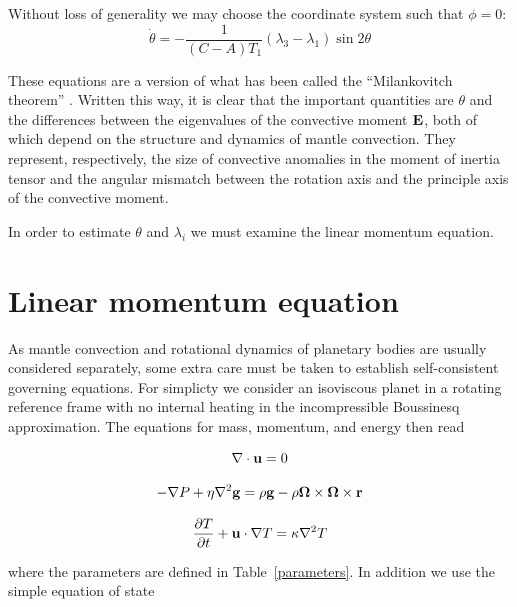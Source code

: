 \documentclass[extra,mreferee]{gji}
\begin{document}
Without loss of generality we may choose the coordinate system such that $\phi=0$:
\begin{equation}
\dot{\theta} = - \frac{1}{(C-A)T_1} (\lambda_3-\lambda_1) \sin{2 \theta}
\label{simple_milankovitch}
\end{equation}

These equations are a version of what has been called the ``Milankovitch theorem'' \citep{munk1960rotation}.  
Written this way, it is clear that the important quantities are $\theta$ and the differences between the eigenvalues of the convective moment $\bf E$, both of which depend on the structure and dynamics of mantle convection.  
They represent, respectively, the size of convective anomalies in the moment of inertia tensor and the angular mismatch between the rotation axis and the principle axis of the convective moment.

In order to estimate $\theta$ and $\lambda_i$ we must examine the linear momentum equation.


\section{Linear momentum equation}
\label{sec:linear}

As mantle convection and rotational dynamics of planetary bodies are usually considered separately, some extra care must be taken to establish self-consistent governing equations.  
For simplicty we consider an isoviscous planet in a rotating reference frame with no internal heating in the incompressible Boussinesq approximation.  The equations for mass, momentum, and energy then read

\begin{equation}
\nabla \cdot {\bf u} = 0
\label{conserve_mass}
\end{equation}

\begin{equation}
\begin{aligned}
- \nabla P + \eta \nabla^2 {\bf g} =  \rho {\bf g} -  \rho{\bf \Omega \times \Omega \times r}
\label{navier_stokes}
\end{aligned}
\end{equation}

\begin{equation}
\frac{\partial T}{\partial t} + {\bf u} \cdot \nabla T = \kappa \nabla^2 T
\label{energy}
\end{equation}

where the parameters are defined in Table~\ref{parameters}.
In addition we use the simple equation of state
\end{document}
